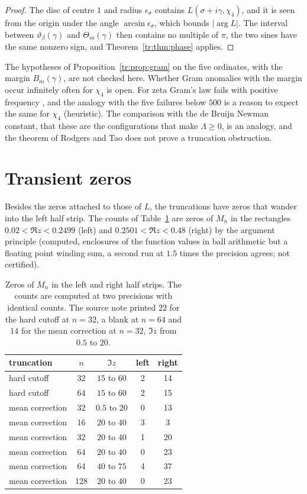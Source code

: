\begin{proof}
The disc of centre $1$ and radius $\epsilon_\sigma$ contains $L(\sigma+i\gamma,\chi_4)$, and it is seen from the origin under the angle $\arcsin\epsilon_\sigma$, which bounds $|\arg L|$. The interval between $\vartheta_\beta(\gamma)$ and $\Theta_m(\gamma)$ then contains no multiple of $\pi$, the two sines have the same nonzero sign, and Theorem~\ref{tr:thm:phase} applies.
\end{proof}

The hypotheses of Proposition~\ref{tr:prop:gram} on the five ordinates, with the margin $B_m(\gamma)$, are not checked here. Whether Gram anomalies with the margin occur infinitely often for $\chi_4$ is open. For zeta Gram's law fails with positive frequency \cite{Trudgian11b}, and the analogy with the five failures below $500$ is a reason to expect the same for $\chi_4$ (heuristic). The comparison with the de Bruijn Newman constant, that these are the configurations that make $\Lambda\ge0$, is an analogy, and the theorem of Rodgers and Tao \cite{RodgersTao} does not prove a truncation obstruction.

\section{Transient zeros}\label{tr:sec:transient}

Besides the zeros attached to those of $L$, the truncations have zeros that wander into the left half strip. The counts of Table~\ref{tr:tab:counts} are zeros of $M_n$ in the rectangles $0.02<\Re z<0.2499$ (left) and $0.2501<\Re z<0.48$ (right) by the argument principle (computed, enclosures of the function values in ball arithmetic but a floating point winding sum, a second run at $1.5$ times the precision agrees; not certified).

\begin{table}[h]\centering\small
\begin{tabular}{lcccc}
\toprule
truncation & $n$ & $\Im z$ & left & right\\
\midrule
hard cutoff & 32 & $15$ to $60$ & 2 & 14\\
hard cutoff & 64 & $15$ to $60$ & 2 & 15\\
mean correction & 32 & $0.5$ to $20$ & 0 & 13\\
mean correction & 16 & $20$ to $40$ & 3 & 3\\
mean correction & 32 & $20$ to $40$ & 1 & 20\\
mean correction & 64 & $20$ to $40$ & 0 & 23\\
mean correction & 64 & $40$ to $75$ & 4 & 37\\
mean correction & 128 & $20$ to $40$ & 0 & 23\\
\bottomrule
\end{tabular}
\caption{Zeros of $M_n$ in the left and right half strips. The counts are computed at two precisions with identical counts. The source note printed $22$ for the hard cutoff at $n=32$, a blank at $n=64$ and $14$ for the mean correction at $n=32$, $\Im z$ from $0.5$ to $20$.}\label{tr:tab:counts}
\end{table}

